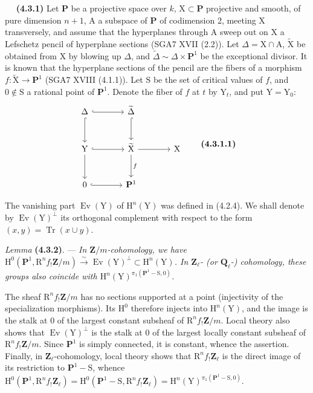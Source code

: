 \documentclass[11pt,leqno]{article}
\newcommand{\Page}[1]{\ifvmode\noindent\else\unskip\ \fi{\footnotesize\textcolor{gray}{[p.\,#1]}}\ \ignorespaces}
\begin{document}
\Page{222}
\textbf{(4.3.1)} Let \(\mathbf{P}\) be a projective space over \(k\), \(\mathrm{X}\subset\mathbf{P}\) projective and smooth, of pure dimension \(n+1\), \(\mathrm{A}\) a subspace of \(\mathbf{P}\) of codimension 2, meeting \(\mathrm{X}\) transversely, and assume that the hyperplanes through \(\mathrm{A}\) sweep out on \(\mathrm{X}\) a Lefschetz pencil of hyperplane sections (SGA7 XVII (2.2)). Let \(\Delta=\mathrm{X}\cap\mathrm{A}\), \(\widetilde{\mathrm{X}}\) be obtained from \(\mathrm{X}\) by blowing up \(\Delta\), and \(\widetilde{\Delta}\sim\Delta\times\mathbf{P}^1\) be the exceptional divisor. It is known that the hyperplane sections of the pencil are the fibers of a morphism \(f:\widetilde{\mathrm{X}}\to\mathbf{P}^1\) (SGA7 XVIII (4.1.1)). Let \(\mathrm{S}\) be the set of critical values of \(f\), and \(0\notin\mathrm{S}\) a rational point of \(\mathbf{P}^1\). Denote the fiber of \(f\) at \(t\) by \(\mathrm{Y}_t\), and put \(\mathrm{Y}=\mathrm{Y}_0\):
\[
\begin{tikzcd}[column sep=large,row sep=large]
\Delta \arrow[r,hook] \arrow[d,hook]
  & \widetilde{\Delta} \arrow[d,hook] & {} \\
\mathrm{Y} \arrow[r,hook] \arrow[d]
  & \widetilde{\mathrm{X}} \arrow[r] \arrow[d,"f"]
  & \mathrm{X} \\
0 \arrow[r,hook] & \mathbf{P}^1 & {}
\end{tikzcd}
\tag*{\textbf{(4.3.1.1)}}
\]

The vanishing part \(\operatorname{Ev}(\mathrm{Y})\) of \(\mathrm{H}^n(\mathrm{Y})\) was defined in (4.2.4). We shall denote by \(\operatorname{Ev}(\mathrm{Y})^\perp\) its orthogonal complement with respect to the form \((x,y)=\operatorname{Tr}(x\cup y)\).

\textit{Lemma} \textbf{(4.3.2)}. — \textit{In \(\mathbf{Z}/m\)-cohomology, we have \(\mathrm{H}^0(\mathbf{P}^1,\mathrm{R}^n f_!\mathbf{Z}/m)\xrightarrow{\sim}\operatorname{Ev}(\mathrm{Y})^\perp\subset\mathrm{H}^n(\mathrm{Y})\). In \(\mathbf{Z}_\ell\)- (or \(\mathbf{Q}_\ell\)-) cohomology, these groups also coincide with \(\mathrm{H}^n(\mathrm{Y})^{\pi_1(\mathbf{P}^1-\mathrm{S},0)}\).}

The sheaf \(\mathrm{R}^n f_!\mathbf{Z}/m\) has no sections supported at a point (injectivity of the specialization morphisms). Its \(\mathrm{H}^0\) therefore injects into \(\mathrm{H}^n(\mathrm{Y})\), and the image is the stalk at \(0\) of the largest constant subsheaf of \(\mathrm{R}^n f_!\mathbf{Z}/m\). Local theory also shows that \(\operatorname{Ev}(\mathrm{Y})^\perp\) is the stalk at \(0\) of the largest locally constant subsheaf of \(\mathrm{R}^n f_!\mathbf{Z}/m\). Since \(\mathbf{P}^1\) is simply connected, it is constant, whence the assertion. Finally, in \(\mathbf{Z}_\ell\)-cohomology, local theory shows that \(\mathrm{R}^n f_!\mathbf{Z}_\ell\) is the direct image of its restriction to \(\mathbf{P}^1-\mathrm{S}\), whence \(\mathrm{H}^0(\mathbf{P}^1,\mathrm{R}^n f_!\mathbf{Z}_\ell)=\mathrm{H}^0(\mathbf{P}^1-\mathrm{S},\mathrm{R}^n f_!\mathbf{Z}_\ell)=\mathrm{H}^n(\mathrm{Y})^{\pi_1(\mathbf{P}^1-\mathrm{S},0)}\).
\end{document}
